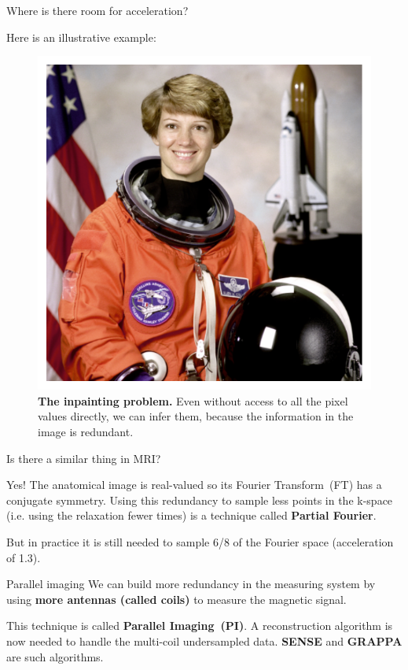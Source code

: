 \documentclass[aspectratio=169,xcolor=dvipsnames]{beamer}
\begin{document}
\begin{frame}{Where is there room for acceleration?}
\begin{overprint}
    \hfill \break
    Here is an illustrative example:
    \begin{figure}
        \centering
        \includegraphics[height=0.4\textheight]{Figures/intro_figures/astronaut.pdf}
        \caption{\label{fig:astronaut}\textbf{The inpainting problem.} Even without access to all the pixel values directly, we can infer them, because the information in the image is redundant.
        }
    \end{figure}
    
        \hfill \break
        Is there a similar thing in MRI?

        Yes! The anatomical image is real-valued so its Fourier Transform~(FT) has a conjugate symmetry.
        Using this redundancy to sample less points in the k-space (i.e. using the relaxation fewer times) is a technique called \textbf{Partial Fourier}.
        
        But in practice it is still needed to sample 6/8 of the Fourier space (acceleration of 1.3).
    
    \end{overprint}
    
\end{frame}

\begin{frame}{Parallel imaging}
    We can build more redundancy in the measuring system by using \textbf{more antennas (called coils)} to measure the magnetic signal.
    
    This technique is called \textbf{Parallel Imaging~(PI)}. 
    A reconstruction algorithm is now needed to handle the multi-coil undersampled data.
        \textbf{SENSE} and \textbf{GRAPPA} are such algorithms.    
\end{frame}
\end{document}
